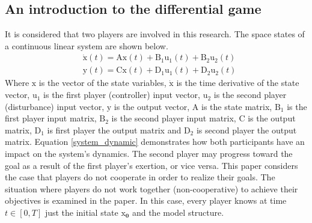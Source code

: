\documentclass[conference]{IEEEtran}
\begin{document}
\subsection{An introduction to the differential game}
It is considered that two players are involved in this research.
The space states of a continuous linear system are shown below.
\begin{equation}\label{system_dynamic}
    \begin{split}
             &\boldsymbol{\dot{\mathrm{x}}}(t) = \boldsymbol{\mathrm{Ax}}(t) + \boldsymbol{\mathrm{B_1u_1}}(t) + \boldsymbol{\mathrm{B_2u_2}}(t)%
        \\
        &\boldsymbol{\mathrm{y}}(t) = \boldsymbol{\mathrm{Cx}}(t) + \boldsymbol{\mathrm{D_1u_1}}(t) + \boldsymbol{\mathrm{D_2u_2}}(t)
    \end{split}
\end{equation}
Where $\boldsymbol{\mathrm{x}}$ is the vector of the state variables, $\boldsymbol{\dot{\mathrm{x}}}$ is the time derivative of the state vector, $\boldsymbol{\mathrm{u_1}}$ is the first player (controller) input vector, $\boldsymbol{\mathrm{u_2}}$ is the second player (disturbance) input vector, $\boldsymbol{\mathrm{y}}$ is the output vector, $\boldsymbol{\mathrm{A}}$ is the state matrix, $\boldsymbol{\mathrm{B_1}}$ is the first player input matrix, $\boldsymbol{\mathrm{B_2}}$ is the second player input matrix,
$\boldsymbol{\mathrm{C}}$ is the output matrix, $\boldsymbol{\mathrm{D_1}}$ is first player the output matrix and $\boldsymbol{\mathrm{D_2}}$ is second player the output matrix.
Equation \eqref{system_dynamic} demonstrates how both participants have an impact on the system's dynamics.
The second player may progress toward the goal as a result of the first player's exertion, or vice versa.
This paper considers the case that players do not cooperate in order to realize their goals.
The situation where players do not work together (non-cooperative) to achieve their objectives is examined in the paper.
In this case, every player knows at time $t \in [0, T]$ just the initial state $\boldsymbol{\mathrm{x}_0}$ and the model structure.
\end{document}
